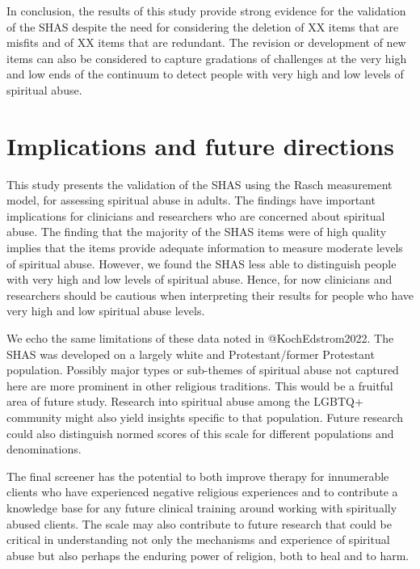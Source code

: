 \documentclass[
  letterpaper,
]{article}
\begin{document}
In conclusion, the results of this study provide strong evidence for the
validation of the SHAS despite the need for considering the deletion of
XX items that are misfits and of XX items that are redundant. The
revision or development of new items can also be considered to capture
gradations of challenges at the very high and low ends of the continuum
to detect people with very high and low levels of spiritual abuse.

\hypertarget{implications-and-future-directions}{%
\section*{Implications and future
directions}\label{implications-and-future-directions}}

This study presents the validation of the SHAS using the Rasch
measurement model, for assessing spiritual abuse in adults. The findings
have important implications for clinicians and researchers who are
concerned about spiritual abuse. The finding that the majority of the
SHAS items were of high quality implies that the items provide adequate
information to measure moderate levels of spiritual abuse. However, we
found the SHAS less able to distinguish people with very high and low
levels of spiritual abuse. Hence, for now clinicians and researchers
should be cautious when interpreting their results for people who have
very high and low spiritual abuse levels.

We echo the same limitations of these data noted in @KochEdstrom2022.
The SHAS was developed on a largely white and Protestant/former
Protestant population. Possibly major types or sub-themes of spiritual
abuse not captured here are more prominent in other religious
traditions. This would be a fruitful area of future study. Research into
spiritual abuse among the LGBTQ+ community might also yield insights
specific to that population. Future research could also distinguish
normed scores of this scale for different populations and denominations.

The final screener has the potential to both improve therapy for
innumerable clients who have experienced negative religious experiences
and to contribute a knowledge base for any future clinical training
around working with spiritually abused clients. The scale may also
contribute to future research that could be critical in understanding
not only the mechanisms and experience of spiritual abuse but also
perhaps the enduring power of religion, both to heal and to harm.
\end{document}
